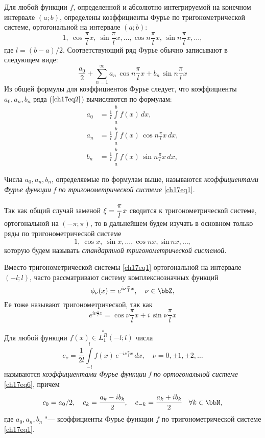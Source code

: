 Для любой функции $f$, определенной и абсолютно интегрируемой на конечном интервале $(a;b)$, определены коэффициенты Фурье по тригонометрической системе, ортогональной на интервале $(a;b)$:
\begin{equation} \label{ch17eq1}
1,\ \cos \frac{\pi}{l}x,\ \sin \frac{\pi}{l}x,\ldots,\cos n\frac{\pi}{l}x,\ \sin n\frac{\pi}{l}x,\ldots,
\end{equation}
где $l = (b - a)/2$. Соответствующий ряд Фурье обычно записывают в следующем виде:
\begin{equation} \label{ch17eq2}
\frac{a_0}{2} + \sum_{n = 1}^{\infty} a_{n}\,\cos n\frac{\pi}{l}x + b_{n}\, \sin n\frac{\pi}{l}x
\end{equation}
Из общей формулы для коэффициентов Фурье следует, что коэффициенты $a_0, a_n, b_n$ ряда ($\ref{ch17eq2}$) вычисляются по формулам:
\begin{align} \label{ch17eq3}
a_0 &= \frac{1}{l} \int\limits_{a}^{b} f(x)\,dx,\\
a_n &= \frac{1}{l} \int\limits_{a}^{b} f(x)\,\cos n\frac{\pi}{l}x\, dx,\\
b_n &= \frac{1}{l} \int\limits_{a}^{b} f(x)\,\sin n\frac{\pi}{l}x\, dx,
\end{align}

\begin{defn}
Числа $a_0, a_n, b_n$, определяемые по формулам выше, называются \textit{коэффициентами Фурье функции f по тригонометрической системе} \eqref{ch17eq1}.
\end{defn}

Так как общий случай заменой $\xi = \cfrac{\pi}{l}\, x$ сводится к тригонометрической системе, ортогональной на $(-\pi;\pi)$, то в дальнейшем будем изучать в основном только ряды по тригонометрической системе
$$
1,\ \cos x,\ \sin x,\ldots,\cos nx,\ \text{sin}\, nx,\ldots,
$$
которую будем называть \textit{стандартной тригонометрической системой.}

Вместо тригонометрической системы \eqref{ch17eq1} ортогональной на интервале $(-l;l)$, часто рассматривают систему комплекснозначных функций
\begin{equation} \label{ch17eq6}
\phi_{\nu}(x) = e^{i\nu\frac{\pi}{l}x},\quad \nu \in \bbZ,
\end{equation}
Ее тоже называют тригонометрической, так как
$$
e^{i\nu\frac{\pi}{l}x} = \cos \nu\frac{\pi}{l}x + i\, \sin \nu\frac{\pi}{l}x
$$
\begin{defn}
Для любой функции $f(x) \in \overset{*}{L^{R}_1}(-l;l)$ числа
\begin{equation}
c_{\nu} = \frac{1}{2l} \int\limits_{-l}^{l} f(x)\, e^{-i\nu\frac{\pi}{l}x}\,dx,\quad \nu = 0,\pm 1, \pm 2,\ldots
\end{equation}
называются \textit{коэффициентами Фурье функции f по ортогональной системе} \eqref{ch17eq6}, причем
\begin{equation}
c_0 = a_0/2, \quad c_{k} = \cfrac{a_k - ib_k}{2}, \quad c_{-k} = \cfrac{a_k + ib_k}{2} \quad \forall k \in \bbN,
\end{equation}
где $a_0, a_n, b_n$ "--- коэффициенты Фурье функции $f$ по тригонометрической системе \eqref{ch17eq1}.
\end{defn}


